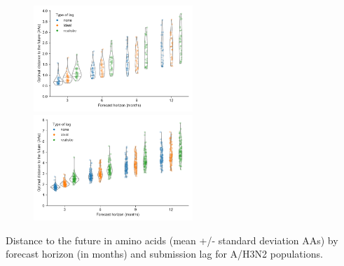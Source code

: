 \documentclass[9pt,lineno]{elife}
\begin{document}
\begin{figure}[htb]
{\includegraphics[width=6cm]{figures/h3n2_optimal_distances_to_the_future_by_delay_and_horizon}}\label{figsupp:h3n2_optimal_distances_to_the_future}
%
{\includegraphics[width=6cm]{figures/simulated_optimal_distances_to_the_future_by_delay_and_horizon}}\label{figsupp:simulated_optimal_distances_to_the_future}
%
\label{figdata:h3n2_distances_to_the_future}
\label{figsrccode:distances_to_the_future}
\end{figure}

\begin{table}[htb]
  \begin{center}
    
    \caption{Distance to the future in amino acids (mean +/- standard deviation AAs) by forecast horizon (in months) and submission lag for A/H3N2 populations.}
    \label{tab:h3n2_distances_to_the_future}
  \end{center}
\end{table}
\end{document}
